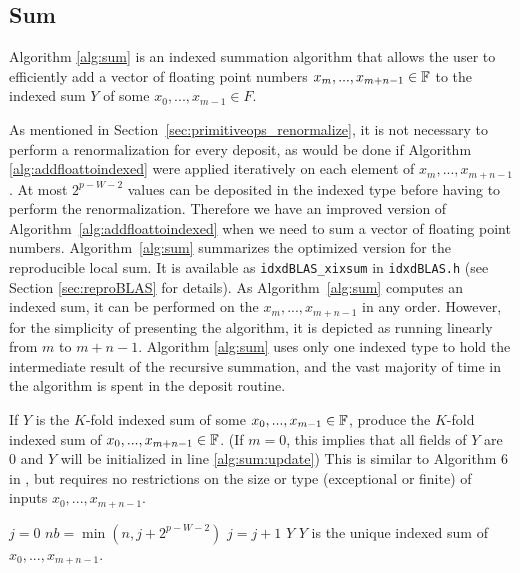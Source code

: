 \subsection{Sum}
  \label{sec:primitiveops_sum}
    Algorithm \ref{alg:sum} is an indexed summation algorithm that allows the user to efficiently add a vector of floating point numbers $x_m, ..., x_{m + n - 1} \in \mathbb{F}$ to the indexed sum $Y$ of some $x_0, ..., x_{m - 1} \in F$.

    As mentioned in Section~\ref{sec:primitiveops_renormalize}, it is not necessary to perform
    a renormalization for every deposit, as would be done if Algorithm \ref{alg:addfloattoindexed} were applied iteratively on each element of $x_m, ..., x_{m + n -1}$. At most $2^{p-W-2}$ values can be deposited in the indexed type before having to perform the renormalization.
    Therefore we have an improved version of Algorithm~\ref{alg:addfloattoindexed} when we need to sum a vector of floating point numbers.
    Algorithm~\ref{alg:sum} summarizes the optimized version for the reproducible local sum. It is available as \texttt{idxdBLAS\_xixsum} in \texttt{idxdBLAS.h} (see Section \ref{sec:reproBLAS} for details).
    As Algorithm~\ref{alg:sum} computes an indexed sum, it can be performed on the $x_m, ..., x_{m + n - 1}$ in any order. However, for the simplicity of presenting the algorithm, it is depicted as running linearly from $m$ to $m + n -1$.
    Algorithm \ref{alg:sum} uses only one indexed type to hold the intermediate result of the recursive summation, and the vast majority of time in the algorithm is spent in the deposit routine.

    \begin{samepage}
    \begin{alg}
      If $Y$ is the $K$-fold indexed sum of some $x_0, ..., x_{m - 1} \in \mathbb{F}$, produce the $K$-fold indexed sum of $x_0, ..., x_{m + n - 1} \in \mathbb{F}$. (If $m = 0$, this implies that all fields of $Y$ are 0 and $Y$ will be initialized in line \ref{alg:sum:update})
      This is similar to Algorithm $6$ in \cite{repsum}, but requires no restrictions on the size or type (exceptional or finite) of inputs $x_0, ..., x_{m + n - 1}$.
      \begin{algorithmic}[1]
          \State $j = 0$ \label{alg:sum:setj}
          \label{alg:sum:outerloop}
            \State $nb = \min(n, j + 2^{p - W - 2})$ \label{alg:sum:nb}
            \State {}\label{alg:sum:update}
              \State {}\label{alg:sum:deposit}
              \State $j = j + 1$
            \EndWhile
            \State {}\label{alg:sum:renorm}
          \EndWhile
          \State \Return $Y$
        \EndFunction
        \Ensure
        \Statex $Y$ is the unique indexed sum of $x_0, ..., x_{m + n - 1}$.
      \end{algorithmic}
      \label{alg:sum}
    \end{alg}
    \end{samepage}


